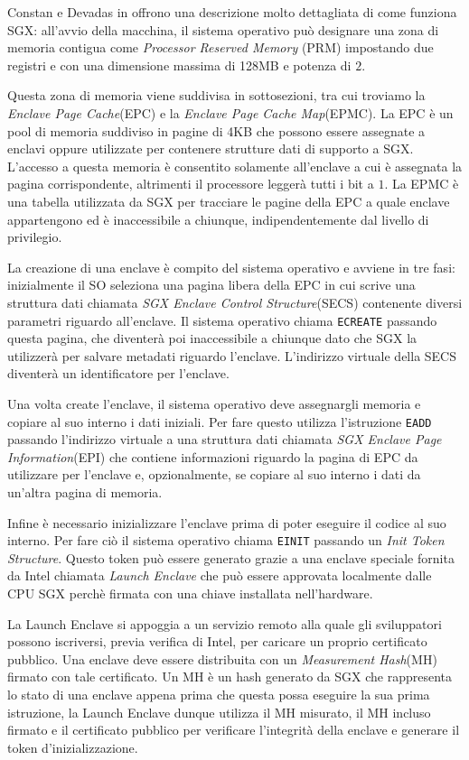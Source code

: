 \documentclass[12pt,italian]{report}
\begin{document}
Constan e Devadas in \cite{sgx_explained} offrono una descrizione molto
dettagliata di come funziona SGX:
all'avvio della macchina, il sistema operativo può designare una zona
di memoria contigua come \textit{Processor Reserved Memory} (PRM) impostando
due registri e con una dimensione massima di 128MB e potenza di $2$.

Questa zona di memoria viene suddivisa in sottosezioni, tra cui troviamo
la \textit{Enclave Page Cache}(EPC) e la
\textit{Enclave Page Cache Map}(EPMC).
La EPC è un pool di memoria suddiviso in pagine di 4KB che possono essere
assegnate a enclavi oppure utilizzate per contenere strutture dati di
supporto a SGX.
L'accesso a questa memoria è consentito solamente all'enclave a cui è
assegnata la pagina corrispondente, altrimenti il processore leggerà tutti
i bit a $1$.
La EPMC è una tabella utilizzata da SGX per tracciare le pagine della EPC
a quale enclave appartengono ed è inaccessibile a chiunque, indipendentemente
dal livello di privilegio.

La creazione di una enclave è compito del sistema operativo e
avviene in tre fasi:
inizialmente il SO seleziona una pagina libera della EPC in cui scrive una
struttura dati chiamata \textit{SGX Enclave Control Structure}(SECS)
contenente diversi parametri riguardo all'enclave. 
Il sistema operativo chiama \texttt{ECREATE} passando questa pagina, che
diventerà poi inaccessibile a chiunque dato che SGX la utilizzerà per
salvare metadati riguardo l'enclave.
L'indirizzo virtuale della SECS diventerà un identificatore per l'enclave.

Una volta create l'enclave, il sistema operativo deve assegnargli memoria
e copiare al suo interno i dati iniziali.
Per fare questo utilizza l'istruzione \texttt{EADD} passando
l'indirizzo virtuale a una struttura dati chiamata
\textit{SGX Enclave Page Information}(EPI) che contiene
informazioni riguardo la pagina di EPC da utilizzare per l'enclave
e, opzionalmente, se copiare al suo interno i dati da un'altra pagina
di memoria.

Infine è necessario inizializzare l'enclave prima di poter eseguire
il codice al suo interno.
Per fare ciò il sistema operativo chiama \texttt{EINIT} passando
un \textit{Init Token Structure}. Questo token può essere generato grazie
a una enclave speciale fornita da Intel chiamata \textit{Launch Enclave}
che può essere approvata localmente dalle CPU SGX perchè firmata con una
chiave installata nell'hardware.

La Launch Enclave si appoggia a un servizio remoto alla quale
gli sviluppatori possono iscriversi, previa verifica di Intel, per caricare
un proprio certificato pubblico.
Una enclave deve essere distribuita con un \textit{Measurement Hash}(MH)
firmato con tale certificato.
Un MH è un hash generato da SGX che rappresenta lo stato di una enclave appena
prima che questa possa eseguire la sua prima istruzione, la Launch Enclave
dunque utilizza il MH misurato, il MH incluso firmato e il
certificato pubblico per verificare l'integrità della enclave e generare il
token d'inizializzazione.
\end{document}
